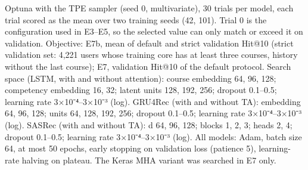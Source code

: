 \begin{table}[t]
\par\smallskip\footnotesize Optuna with the TPE sampler (seed 0, multivariate), 30 trials per model, each trial scored as the mean over two training seeds (42, 101). Trial 0 is the configuration used in E3–E5, so the selected value can only match or exceed it on validation. Objective: E7b, mean of default and strict validation Hit@10 (strict validation set: 4,221 users whose training core has at least three courses, history without the last course); E7, validation Hit@10 of the default protocol. Search space (LSTM, with and without attention): course embedding {64, 96, 128}; competency embedding {16, 32}; latent units {128, 192, 256}; dropout 0.1–0.5; learning rate 3×10⁻⁴–3×10⁻³ (log). GRU4Rec (with and without TA): embedding {64, 96, 128}; units {64, 128, 192, 256}; dropout 0.1–0.5; learning rate 3×10⁻⁴–3×10⁻³ (log). SASRec (with and without TA): d {64, 96, 128}; blocks {1, 2, 3}; heads {2, 4}; dropout 0.1–0.5; learning rate 3×10⁻⁴–3×10⁻³ (log). All models: Adam, batch size 64, at most 50 epochs, early stopping on validation loss (patience 5), learning-rate halving on plateau. The Keras MHA variant was searched in E7 only.
\end{table}
